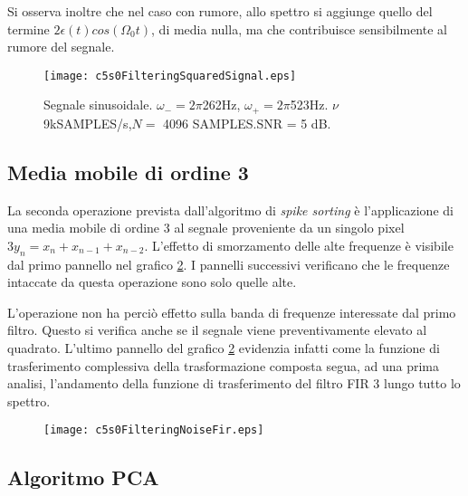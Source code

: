 Si osserva inoltre che nel caso con rumore, allo spettro si aggiunge quello del termine $2\epsilon(t)cos(\Omega_{0}t)$, di media nulla, ma che contribuisce sensibilmente al rumore del segnale.

\begin{figure}%
\centering    
\texttt{[image: c5s0FilteringSquaredSignal.eps]}
\caption[Effetto spettrale dell'elevamento a potenza 2 del segnale]
{Segnale sinusoidale. $\omega_{-}=2\pi$262Hz, $\omega_{+}=2\pi$523Hz. $
\nu$ 9kSAMPLES/s,$N=$ 4096 SAMPLES.SNR = 5 dB.}
\label{fig:c5s0FilteringSquaredSignal}
\end{figure}

\newpage



\subsection{Media mobile di ordine 3}

La seconda operazione prevista dall'algoritmo di {\it spike sorting} è l'applicazione di una media mobile di ordine $3$ al segnale proveniente da un singolo pixel $ 3y_{n} = x_{n} + x_{n-1} + x_{n-2}$. L'effetto di smorzamento delle alte frequenze è visibile dal primo pannello nel grafico \ref{fig:c5s0FilteringNoiseFir.tex}. I pannelli successivi verificano che le frequenze intaccate da questa operazione sono solo quelle alte. 

L'operazione non ha perciò effetto sulla banda di frequenze interessate dal primo filtro. Questo si verifica anche se il segnale viene preventivamente elevato al quadrato. L'ultimo pannello del grafico \ref{fig:c5s0FilteringNoiseFir.tex} evidenzia infatti come la funzione di trasferimento complessiva della trasformazione composta segua, ad una prima analisi, l'andamento della funzione di trasferimento del filtro FIR 3 lungo tutto lo spettro.


\begin{figure}%
\centering    
\texttt{[image: c5s0FilteringNoiseFir.eps]}
\caption[Effetto spettrale del filtro Fir 3]
{}
\label{fig:c5s0FilteringNoiseFir.tex}
\end{figure}

\newpage


\subsection{Algoritmo PCA}
\label{sez:algoritmoPCA}

